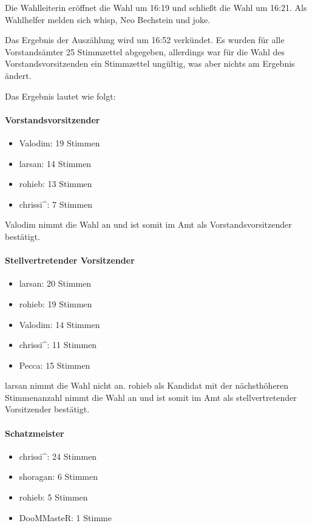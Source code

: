 \documentclass[a4paper,12pt]{scrartcl}
\begin{document}
Die Wahlleiterin eröffnet die Wahl um 16:19 und schließt die Wahl um 16:21. Als
Wahlhelfer melden sich whisp, Neo Bechstein und joke.

Das Ergebnis der Auszählung wird um 16:52 verkündet. Es wurden für alle
Vorstandsämter 25 Stimmzettel abgegeben, allerdings war für die Wahl des
Vorstandsvorsitzenden ein Stimmzettel ungültig, was aber nichts am Ergebnis
ändert.

Das Ergebnis lautet wie folgt:

\paragraph{Vorstandsvorsitzender}
\begin{itemize}
  \item Valodim: 19 Stimmen
  \item larsan: 14 Stimmen
  \item rohieb: 13 Stimmen
  \item chrissi\textasciicircum: 7 Stimmen
\end{itemize}

Valodim nimmt die Wahl an und ist somit im Amt als Vorstandsvorsitzender
bestätigt.

\paragraph{Stellvertretender Vorsitzender}
\begin{itemize}
  \item larsan: 20 Stimmen
  \item rohieb: 19 Stimmen
  \item Valodim: 14 Stimmen
  \item chrissi\textasciicircum: 11 Stimmen
  \item Pecca: 15 Stimmen
\end{itemize}

larsan nimmt die Wahl nicht an. rohieb als Kandidat mit der nächsthöheren
Stimmenanzahl nimmt die Wahl an und ist somit im Amt als stellvertretender
Vorsitzender bestätigt.

\paragraph{Schatzmeister}
\begin{itemize}
  \item chrissi\textasciicircum: 24 Stimmen
  \item shoragan: 6 Stimmen
  \item rohieb: 5 Stimmen
  \item DooMMasteR: 1 Stimme
\end{itemize}
\end{document}
